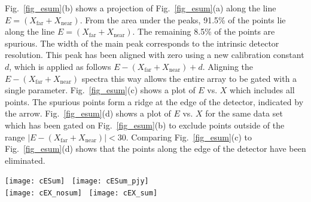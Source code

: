 Fig.~\ref{fig_esum}(b) shows a projection of Fig.~\ref{fig_esum}(a) along the line $E=(X_\mathrm{far} + X_\mathrm{near})$.  From the area under the peaks, 91.5\% of the points lie along the line $E=(X_\mathrm{far} + X_\mathrm{near})$.  The remaining 8.5\% of the points are spurious.  The width of the main peak corresponds to the intrinsic detector resolution.  This peak has been aligned with zero using a new calibration constant $d$, which is applied as follows $E-(X_\mathrm{far} + X_\mathrm{near})+d$.  Aligning the $E-(X_\mathrm{far} + X_\mathrm{near})$ spectra this way allows the entire array to be gated with a single parameter.    Fig.~\ref{fig_esum}(c) shows a plot of $E$ vs. $X$ which includes all points.  The spurious points form a ridge at the edge of the detector, indicated by the arrow. Fig.~\ref{fig_esum}(d) shows a plot of $E$ vs. $X$ for the same data set which has been gated on Fig.~\ref{fig_esum}(b) to exclude points outside of the range $\left|E-(X_\mathrm{far} + X_\mathrm{near})\right|<30$.  Comparing Fig.~\ref{fig_esum}(c) to Fig.~\ref{fig_esum}(d) shows that the points along the edge of the detector have been eliminated.
\begin{figure*}%
\centering
\texttt{[image: cESum]}~
\texttt{[image: cESum\_pjy]}\\
\texttt{[image: cEX\_nosum]}~
\texttt{[image: cEX\_sum]}
\caption[Method of rejection spurious counts by gating $E-(X_\mathrm{far} + X_\mathrm{near})$]{Method of rejection spurious counts by gating $E-(X_\mathrm{far} + X_\mathrm{near})$. (a) Plot of $E$ vs. $(X_\mathrm{far} + X_\mathrm{near})$ for an individual detector.  The loci of counts that do not lie on the line $E=(X_\mathrm{far} + X_\mathrm{near})$, indicated by the arrow, are spurious.  (b) Projection of panel (a) along the line $E=(X_\mathrm{far} + X_\mathrm{near})$. The peak corresponding to the ``good'' events have been aligned with zero.  The width of the peak is equal to the intrinsic resolution of the detector. (c) $E$ vs. $X$ spectrum with no points excluded.  The loci of points in the region indicated by the arrow correspond to the smaller peak in panel (c). (d) $E$ vs. $X$ spectrum requiring $E=(X_\mathrm{far} + X_\mathrm{near})$ which no longer has pathological points at the detector edges.}%
\label{fig_esum}%
\end{figure*}

